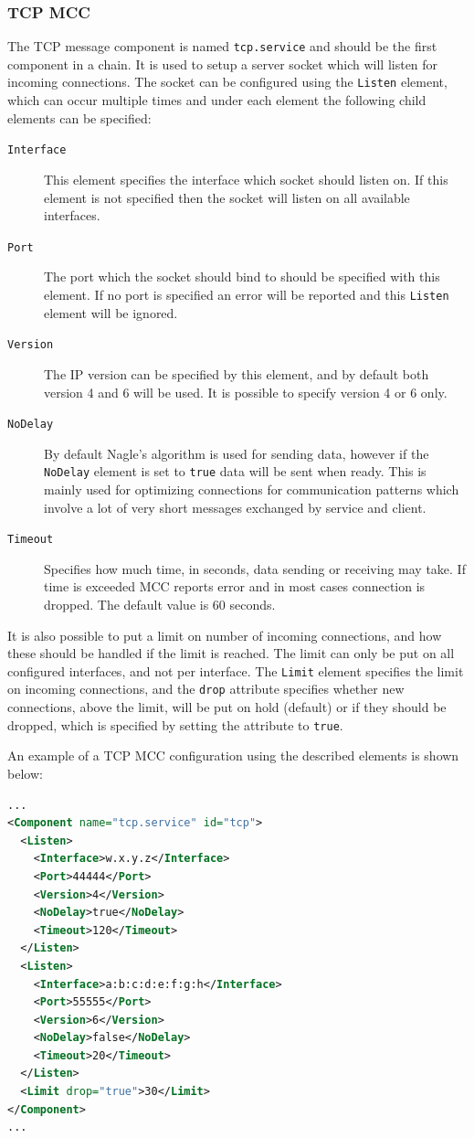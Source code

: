 \documentclass{article}
\begin{document}
\subsubsection{TCP MCC}\label{sec:tcp-mcc}
The TCP message component is named \texttt{tcp.service} and should be the first
component in a chain. It is used to setup a server socket which will listen for
incoming connections. The socket can be configured using the \texttt{Listen}
element, which can occur multiple times and under each element the following
child elements can be specified:
\begin{description}
\item[\texttt{Interface}] This element specifies the interface which socket
  should listen on. If this element is not specified then the socket will listen
  on all available interfaces.
\item[\texttt{Port}] The port which the socket should bind to should be
  specified with this element. If no port is specified an error will be reported
  and this \texttt{Listen} element will be ignored.
\item[\texttt{Version}] The IP version can be specified by this element, and by
  default both version 4 and 6 will be used. It is possible to specify version 4
  or 6 only.
\item[\texttt{NoDelay}] By default Nagle's algorithm is used for sending data,
  however if the \texttt{NoDelay} element is set to \texttt{true} data will be
  sent when ready. This is mainly used for optimizing connections for communication
  patterns which involve a lot of very short messages exchanged by service 
  and client.
\item[\texttt{Timeout}] Specifies how much time, in seconds, data sending or
  receiving may take. If time is exceeded MCC reports error and in most cases 
  connection is dropped. The default value is 60 seconds.
\end{description}
It is also possible to put a limit on number of incoming connections, and how 
these should be handled if the limit is reached. The limit can only be put on all 
configured interfaces, and not per interface. The \texttt{Limit} element specifies 
the limit on incoming connections, and the \texttt{drop} attribute specifies whether 
new connections, above the limit, will be put on hold (default) or if they should 
be dropped, which is specified by setting the attribute to \texttt{true}.

An example of a TCP MCC configuration using the described elements is shown
below:
\begin{lstlisting}[language=xml]
...
<Component name="tcp.service" id="tcp">
  <Listen>
    <Interface>w.x.y.z</Interface>
    <Port>44444</Port>
    <Version>4</Version>
    <NoDelay>true</NoDelay>
    <Timeout>120</Timeout>
  </Listen>
  <Listen>
    <Interface>a:b:c:d:e:f:g:h</Interface>
    <Port>55555</Port>
    <Version>6</Version>
    <NoDelay>false</NoDelay>
    <Timeout>20</Timeout>
  </Listen>
  <Limit drop="true">30</Limit>
</Component>
...
\end{lstlisting}
\end{document}
